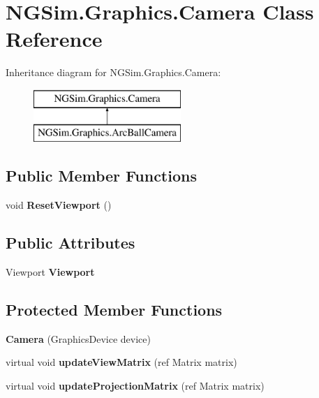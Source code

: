 \hypertarget{class_n_g_sim_1_1_graphics_1_1_camera}{}\section{N\+G\+Sim.\+Graphics.\+Camera Class Reference}
\label{class_n_g_sim_1_1_graphics_1_1_camera}
Inheritance diagram for N\+G\+Sim.\+Graphics.\+Camera\+:\begin{figure}[H]
\begin{center}
\leavevmode
\includegraphics[height=2.000000cm]{class_n_g_sim_1_1_graphics_1_1_camera}
\end{center}
\end{figure}
\subsection*{Public Member Functions}
\begin{DoxyCompactItemize}
\item 
\mbox{\label{class_n_g_sim_1_1_graphics_1_1_camera_abec0a7493aa6513284b80e7e0cadb03a}} 
void {\bfseries Reset\+Viewport} ()
\end{DoxyCompactItemize}
\subsection*{Public Attributes}
\begin{DoxyCompactItemize}
\item 
\mbox{\label{class_n_g_sim_1_1_graphics_1_1_camera_ad39775218955a365d52884fe220bbedb}} 
Viewport {\bfseries Viewport}
\end{DoxyCompactItemize}
\subsection*{Protected Member Functions}
\begin{DoxyCompactItemize}
\item 
\mbox{\label{class_n_g_sim_1_1_graphics_1_1_camera_a1e459b0385bd925bf35cf1a1bc497b20}} 
{\bfseries Camera} (Graphics\+Device device)
\item 
\mbox{\label{class_n_g_sim_1_1_graphics_1_1_camera_a6447f0d3aa9e9f50368bba38ea0deb50}} 
virtual void {\bfseries update\+View\+Matrix} (ref Matrix matrix)
\item 
\mbox{\label{class_n_g_sim_1_1_graphics_1_1_camera_ae8962958d3f2685f0c3eda993235d685}} 
virtual void {\bfseries update\+Projection\+Matrix} (ref Matrix matrix)
\end{DoxyCompactItemize}

